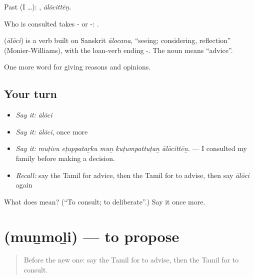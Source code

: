 Past (I …): , \emph{ālōcittēṉ}.

Who is consulted takes - or -:  .

\begin{cousinweb}
\textbf{} (\emph{ālōci}) is a verb built on Sanskrit \emph{ālocana}, \textquotedblleft{}seeing; considering, reflection\textquotedblright{} (Monier-Williams), with the loan-verb ending -. The noun  means \textquotedblleft{}advice\textquotedblright{}.
\end{cousinweb}

\begin{grammarlens}[title={What you've built}]
One more word for giving reasons and opinions.
\end{grammarlens}

\subsection*{Your turn}
\begin{itemize}
\raggedright
  \item \emph{Say it:} \emph{ālōci}
  \item \emph{Say it:} \emph{ālōci}, once more
  \item \emph{Say it:} \emph{muṭivu eṭuppataṟku muṉ kuṭumpattuṭaṉ ālōcittēṉ.} — I consulted my family before making a decision.
  \item \emph{Recall:} say the Tamil for advice, then the Tamil for to advise, then say \emph{ālōci} again
\end{itemize}

\begin{tcolorbox}[breakable,colback=teal!4,colframe=teal!35!black,title={Before you move on}]
What does  mean? (\textquotedblleft{}To consult; to deliberate\textquotedblright{}.) Say it once more.
\end{tcolorbox}
\section[\texorpdfstring{\ta{முன்மொழி} (muṉmoḻi)}{முன்மொழி (muṉmoḻi)}]{ (muṉmoḻi) — to propose}

\label{lesson:TA-C355-munmoli}



\begin{quote}
Before the new one: say the Tamil for to advise, then the Tamil for to consult.
\end{quote}

